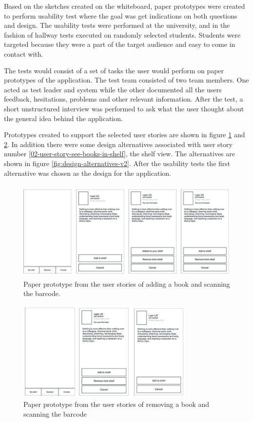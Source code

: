 Based on the sketches created on the whiteboard, paper prototypes were created to perform usability test where the goal was get indications on both questions and design.
The usability tests were performed at the university, and in the fashion of hallway tests executed on randomly selected students. Students were targeted because they were a part of the target audience and easy to come in contact with. 

 The tests would consist of a set of tasks the user would perform on paper prototypes of the application. The test team consisted of two team members. One acted as test leader and system while the other documented all the users feedback, hesitations, problems and other relevant information. After the test, a short unstructured interview was performed to ask what the user thought about the general idea behind the application. 

Prototypes created to support the selected user stories are shown in figure \ref{fig:user-story-prototype-v2-1} and \ref{fig:user-story-prototype-v2-2}.
In addition there were some design alternatives associated with user story number \ref{02-user-story-see-books-in-shelf}, the shelf view. The alternatives are shown in figure \ref{fig:design-alternatives-v2}. After the usability tests the first alternative was chosen as the design for the application. 

\begin{figure}
\centering
\includegraphics[height=5cm]{figs/v02/userstory-v2-1.jpg}
\caption{Paper prototype from the user stories of adding a book and scanning the barcode. }
\label{fig:user-story-prototype-v2-1}
\end{figure}

\begin{figure}
\centering
\includegraphics[height=5cm]{figs/v02/userstory-v2-2.jpg}
\caption{Paper prototype from the user stories of removing a book and scanning the barcode }
\label{fig:user-story-prototype-v2-2}
\end{figure}

